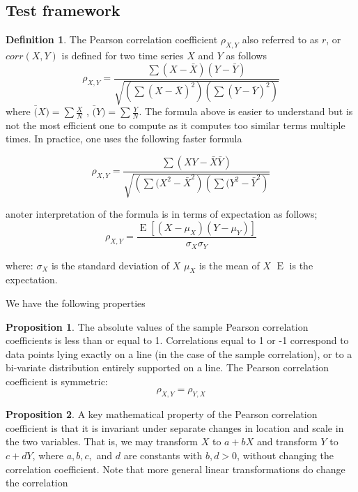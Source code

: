 \documentclass[a4paper]{article}
\theoremstyle{definition}
\theoremstyle{proposition}
\newtheorem{definition}{Definition}[section]
\newtheorem{proposition}{Proposition}[section]
\begin{document}
\subsection{Test framework}
\begin{definition}
The Pearson correlation coefficient $\rho_{X,Y}$  also referred to as $r$, or $corr(X,Y)$  is defined for two time series $X$ and $Y$ as follows
\begin{equation}
\rho_{X,Y}= \frac{\sum ( X - \bar{X}) ( Y - \bar{Y} ) }  { \sqrt{  \left( \sum (X - \bar{X}) ^2 \right) \left(  \sum  (Y- \bar{Y}) ^2  \right) } }
\end{equation}
where $\bar(X) = \sum \frac{X}{N}$ , $\bar(Y) = \sum \frac{Y}{N}$. The formula above is easier to understand but is not the most efficient one to compute as it computes too similar terms multiple times. In practice, one uses the following faster formula

\begin{equation}
\rho_{X,Y} = \frac{\sum ( X Y - \bar{X} \bar{Y} ) }  { \sqrt{  \left( \sum (X^2 - \bar{X}^2 \right) \left(  \sum  (Y^2 - \bar{Y} ^2  \right) } }
\end{equation}

anoter interpretation of the formula is in terms of expectation as follows;
\[
\rho_{X,Y}=\frac{\operatorname{E}[(X-\mu_X)(Y-\mu_Y)]}{\sigma_X\sigma_Y} 
\]

where:
$\sigma_X $  is the standard deviation of $X$
$\mu_X$ is the mean of $X$
$\operatorname{E}$ is the expectation.

\end{definition}

We have the following properties
\begin{proposition}
The absolute values of the sample Pearson correlation coefficients is less than or equal to 1. Correlations equal to 1 or -1 correspond to data points lying exactly on a line (in the case of the sample correlation), or to a bi-variate distribution entirely supported on a line. The Pearson correlation coefficient is symmetric: 
\[ 
\rho_{X,Y}= \rho_{Y,X}
\]
\end{proposition}

\begin{proposition}
A key mathematical property of the Pearson correlation coefficient is that it is invariant under separate changes in location and scale in the two variables. That is, we may transform $X$ to $ a + bX$ and transform $Y$ to $c + dY$, where $a, b, c,$ and $d$ are constants with $b, d > 0$, without changing the correlation coefficient. Note that more general linear transformations do change the correlation
\end{proposition}
\end{document}
